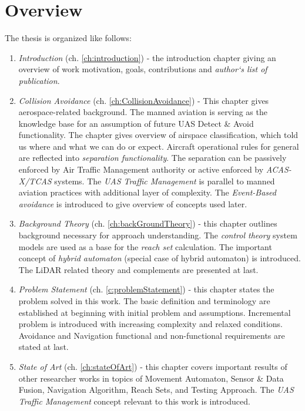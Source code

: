 \section{ Overview}\label{s:Overview}

\noindent The thesis is organized like follows:

\begin{enumerate}
    \item \emph{Introduction} (ch. \ref{ch:introduction}) - the introduction chapter giving an overview of work motivation, goals, contributions and \emph{author`s list of publication}.
    
    \item \emph{Collision Avoidance} (ch. \ref{ch:CollisionAvoidance}) - This chapter gives aerospace-related background. The manned aviation is serving as the knowledge base for an assumption of future UAS Detect \& Avoid functionality. The chapter gives overview of airspace classification, which told us where and what we can do or expect. Aircraft operational rules for general are reflected into \emph{separation functionality}. The separation can be passively enforced by Air Traffic Management authority or active enforced by \emph{ACAS-X/TCAS} systems. The \emph{UAS Traffic Management} is parallel to manned aviation practices with additional layer of complexity.  The \emph{Event-Based avoidance} is introduced to give overview of concepts used later.
    
    \item \emph{Background Theory} (ch. \ref{ch:backGroundTheory}) - this chapter outlines background necessary for approach understanding. The \emph{control theory} system models are used as a base for the \emph{reach set} calculation. The important concept of \emph{hybrid automaton} (special case of hybrid automaton) is introduced. The LiDAR related theory and complements are presented at last. 
    
    \item \emph{Problem Statement} (ch. \ref{c:problemStatement}) - this chapter states the problem solved in this work. The basic definition and terminology are established at beginning with initial problem and assumptions. Incremental problem is introduced with increasing complexity and relaxed conditions. Avoidance and Navigation functional and non-functional requirements are stated at last. 
    
    \item \emph{State of Art} (ch. \ref{ch:stateOfArt}) - this chapter covers important results of other researcher works in topics of Movement Automaton, Sensor \& Data Fusion, Navigation Algorithm, Reach Sets, and Testing Approach. The \emph{UAS Traffic Management} concept relevant to this work is introduced.  
    

\end{enumerate}
